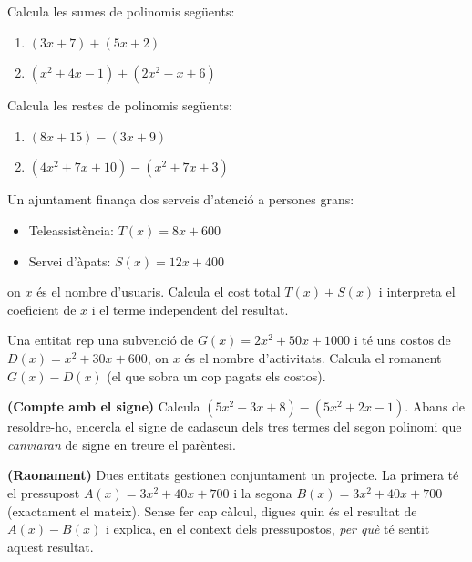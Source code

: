 \begin{exercicis}
\begin{exlist}
  \item Calcula les sumes de polinomis següents:
    \begin{enumerate}[label=\alph*), leftmargin=1.6em, topsep=2pt]
      \item $(3x + 7) + (5x + 2)$
      \item $(x^2 + 4x - 1) + (2x^2 - x + 6)$
    \end{enumerate}

  \item Calcula les restes de polinomis següents:
    \begin{enumerate}[label=\alph*), leftmargin=1.6em, topsep=2pt]
      \item $(8x + 15) - (3x + 9)$
      \item $(4x^2 + 7x + 10) - (x^2 + 7x + 3)$
    \end{enumerate}

  \item Un ajuntament finança dos serveis d'atenció a persones grans:
    \begin{itemize}[leftmargin=1.4em, itemsep=2pt, topsep=2pt]
      \item Teleassistència: $T(x) = 8x + 600$
      \item Servei d'àpats: $S(x) = 12x + 400$
    \end{itemize}
    on $x$ és el nombre d'usuaris. Calcula el cost total $T(x)+S(x)$ i
    interpreta el coeficient de $x$ i el terme independent del resultat.

  \item Una entitat rep una subvenció de $G(x) = 2x^2 + 50x + \num{1000}$
        i té uns costos de $D(x) = x^2 + 30x + 600$, on $x$ és el nombre
        d'activitats. Calcula el romanent $G(x) - D(x)$ (el que sobra un cop
        pagats els costos).

  \item \textbf{(Compte amb el signe)} Calcula $(5x^2 - 3x + 8) - (5x^2 + 2x - 1)$.
        Abans de resoldre-ho, encercla el signe de cadascun dels tres termes
        del segon polinomi que \emph{canviaran} de signe en treure el parèntesi.

  \item \textbf{(Raonament)} Dues entitats gestionen conjuntament un projecte.
        La primera té el pressupost $A(x) = 3x^2 + 40x + 700$ i la segona
        $B(x) = 3x^2 + 40x + 700$ (exactament el mateix). Sense fer cap càlcul,
        digues quin és el resultat de $A(x) - B(x)$ i explica, en el context
        dels pressupostos, \emph{per què} té sentit aquest resultat.
\end{exlist}
\end{exercicis}


